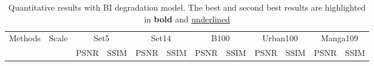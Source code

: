 \documentclass[runningheads]{llncs}
\begin{document}
\begin{table}[!ht]
	\scriptsize 
	\centering
	\caption{Quantitative results with BI degradation model. The best and second best results are highlighted in \textbf{bold} and \underline{underlined}}
	\begin{tabular}{|p{7em}|p{2.5em}|p{2.5em}|p{3em}|p{2.5em}|p{3em}|p{2.5em}|p{3em}|p{2.5em}|p{3em}|p{2.5em}|p{3em}|} 
		\hline
		\multicolumn{1}{|c|}{\multirow{2}{*}{{ Methods} }} & \multicolumn{1}{c|}{\multirow{2}{*}{Scale}} & \multicolumn{2}{c}{Set5} & \multicolumn{2}{c}{Set14} & \multicolumn{2}{c}{B100} & \multicolumn{2}{c}{Urban100} & \multicolumn{2}{c|}{ Manga109} \\
		\cline{3-12}   \multicolumn{1}{|c|}{} & \multicolumn{1}{c|}{} &  PSNR  & SSIM  & PSNR   & SSIM  & PSNR  & SSIM  & PSNR  & SSIM  & PSNR  & SSIM \\
		\hline
		

\end{tabular}
\end{table}
\end{document}
